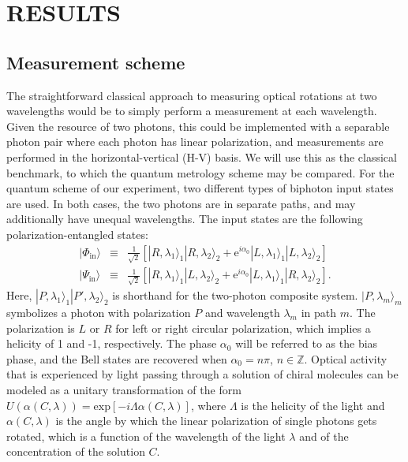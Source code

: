 \documentclass[12pt,preprint]{revtex4}
\begin{document}
\section*{RESULTS}
\subsection*{Measurement scheme}
The straightforward classical approach to measuring optical rotations at two wavelengths would be to simply perform a measurement at each wavelength. Given the resource of two photons, this could be implemented with a separable photon pair where each photon has linear polarization, and measurements are performed in the horizontal-vertical (H-V) basis. We will use this as the classical benchmark, to which the quantum metrology scheme may be compared. 
For the quantum scheme of our experiment, two different types of biphoton input states are used. In both cases, the two photons are in separate paths, and may additionally have unequal wavelengths. The input states are the following polarization-entangled states:
\begin{eqnarray}
|\Phi_{\mathrm{in}}\rangle&\equiv&\frac{1}{\sqrt{2}}\left[|R,\lambda_{1}\rangle_{1}|R,\lambda_{2}\rangle_{2}+\mathrm{e}^{i\alpha_{0}}|L,\lambda_{1}\rangle_{1}|L,\lambda_{2}\rangle_{2}\right] \label{Eq:input1} \\
|\Psi_{\mathrm{in}}\rangle&\equiv&\frac{1}{\sqrt{2}}\left[|R,\lambda_{1}\rangle_{1}|L,\lambda_{2}\rangle_{2}+\mathrm{e}^{i\alpha_{0}}|L,\lambda_{1}\rangle_{1}|R,\lambda_{2}\rangle_{2}\right]. \label{Eq:input2}
\end{eqnarray}
Here, $|P,\lambda_1\rangle_1 |P',\lambda_{2}\rangle_{2}$ is shorthand for the two-photon composite system. $|P,\lambda_m\rangle_m$ symbolizes a photon with polarization $P$ and wavelength $\lambda_m$ in path $m$. The polarization is $L$ or $R$ for left or right circular polarization, which implies a helicity of 1 and -1, respectively. The phase $\alpha_0$ will be referred to as the bias phase, and the Bell states are recovered when $\alpha_0=n\pi$, $n\in \mathbb{Z}$.
Optical activity that is experienced by light passing through a solution of chiral molecules can be modeled as a unitary transformation of the form $U\left(\alpha\left(C,\lambda\right)\right)=\mathrm{exp}\left[-i\Lambda\alpha\left(C,\lambda\right)\right]$, where $\Lambda$ is the helicity of the light and $\alpha\left(C,\lambda\right)$ is the angle by which the linear polarization of single photons gets rotated, which is a function of the wavelength of the light $\lambda$ and of the concentration of the solution $C$. 
\end{document}
